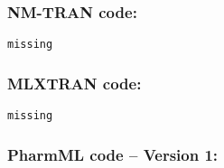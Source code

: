 \subsubsection{NM-TRAN code:}

\myStartLine

\lstset{language=NONMEMdataSet}
\begin{lstlisting}
missing
\end{lstlisting}

\myEndLine

\subsubsection{MLXTRAN code:}

\myStartLine

\lstset{language=MLXTRANcode}
\begin{lstlisting}
missing
\end{lstlisting}

\myEndLine

\subsubsection{PharmML code -- Version 1:}

